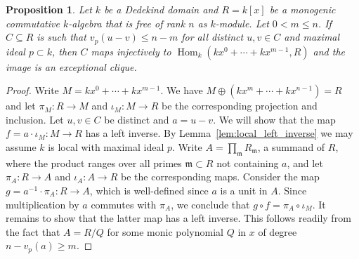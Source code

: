 \documentclass{amsart}
\theoremstyle{plain}
\newtheorem{lemma}[theorem]{Lemma}
\newtheorem{proposition}[theorem]{Proposition}
\theoremstyle{definition}
\DeclareMathOperator{\Hom}{Hom}
\newcommand{\Q}{\ensuremath{\mathbb{Q}}}
\newcommand{\m}{\ensuremath{\mathfrak{m}}}
\newcommand{\clq}{C}
\begin{document}

\begin{proposition}\label{prop:rank_metric_general}
	Let \(k\) be a Dedekind domain and \(R=k[x]\) be a monogenic commutative \(k\)-algebra that is free of rank \(n\) as \(k\)-module. Let \(0<m\leq n\).
	If \(\clq\subseteq R\) is such that \(v_p(u-v)\leq n-m\) for all distinct \(u,v\in \clq\) and maximal ideal \(p\subset k\), then \(\clq\) maps injectively to \(\Hom_k(kx^0+\dotsm+kx^{m-1},R)\) and the image is an exceptional clique.
\end{proposition}
\begin{proof}
	Write \(M=kx^0+\dotsm+kx^{m-1}\). We have \(M\oplus(kx^m+\dotsm+kx^{n-1})=R\) and let \(\pi_M:R\to M\) and \(\iota_M:M\to R\) be the corresponding projection and inclusion.
	Let \(u,v\in \clq\) be distinct and \(a=u-v\). We will show that the map \(f=a\cdot \iota_M:M\to R\) has a left inverse.
	By Lemma~\ref{lem:local_left_inverse} we may assume \(k\) is local with maximal ideal \(p\). 
	Write \(A=\prod_\m R_\m\), a summand of \(R\), where the product ranges over all primes \(\m\subset R\) not containing \(a\), and let \(\pi_A:R\to A\) and \(\iota_A:A\to R\) be the corresponding maps.
	Consider the map \(g=a^{-1} \cdot \pi_A : R\to A\), which is well-defined since \(a\) is a unit in \(A\). 
	Since multiplication by \(a\) commutes with \(\pi_A\), we conclude that \(g\circ f=\pi_A\circ\iota_M\). It remains to show that the latter map has a left inverse.
	This follows readily from the fact that \(A=R/Q\) for some monic polynomial \(Q\) in \(x\) of degree \(n-v_p(a)\geq m\).
\end{proof}
\end{document}
